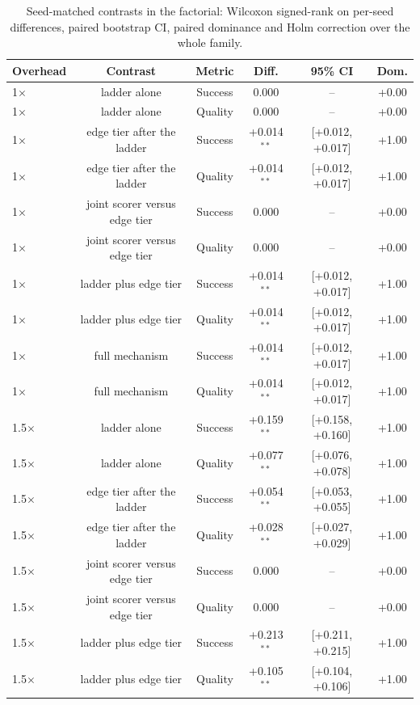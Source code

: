 \begin{table}
\centering
\scriptsize
\caption{Seed-matched contrasts in the factorial: Wilcoxon signed-rank on per-seed differences, paired bootstrap CI, paired dominance and Holm correction over the whole family.}
\label{tab:p2-factorial-tests}
\begin{tabular}{lccccc}
\toprule
Overhead & Contrast & Metric & Diff. & 95\% CI & Dom. \\
\midrule
1$\times$ & ladder alone & Success & 0.000 & -- & +0.00 \\
1$\times$ & ladder alone & Quality & 0.000 & -- & +0.00 \\
1$\times$ & edge tier after the ladder & Success & +0.014$^{**}$ & [+0.012, +0.017] & +1.00 \\
1$\times$ & edge tier after the ladder & Quality & +0.014$^{**}$ & [+0.012, +0.017] & +1.00 \\
1$\times$ & joint scorer versus edge tier & Success & 0.000 & -- & +0.00 \\
1$\times$ & joint scorer versus edge tier & Quality & 0.000 & -- & +0.00 \\
1$\times$ & ladder plus edge tier & Success & +0.014$^{**}$ & [+0.012, +0.017] & +1.00 \\
1$\times$ & ladder plus edge tier & Quality & +0.014$^{**}$ & [+0.012, +0.017] & +1.00 \\
1$\times$ & full mechanism & Success & +0.014$^{**}$ & [+0.012, +0.017] & +1.00 \\
1$\times$ & full mechanism & Quality & +0.014$^{**}$ & [+0.012, +0.017] & +1.00 \\
1.5$\times$ & ladder alone & Success & +0.159$^{**}$ & [+0.158, +0.160] & +1.00 \\
1.5$\times$ & ladder alone & Quality & +0.077$^{**}$ & [+0.076, +0.078] & +1.00 \\
1.5$\times$ & edge tier after the ladder & Success & +0.054$^{**}$ & [+0.053, +0.055] & +1.00 \\
1.5$\times$ & edge tier after the ladder & Quality & +0.028$^{**}$ & [+0.027, +0.029] & +1.00 \\
1.5$\times$ & joint scorer versus edge tier & Success & 0.000 & -- & +0.00 \\
1.5$\times$ & joint scorer versus edge tier & Quality & 0.000 & -- & +0.00 \\
1.5$\times$ & ladder plus edge tier & Success & +0.213$^{**}$ & [+0.211, +0.215] & +1.00 \\
1.5$\times$ & ladder plus edge tier & Quality & +0.105$^{**}$ & [+0.104, +0.106] & +1.00 \\

\end{tabular}
\end{table}
